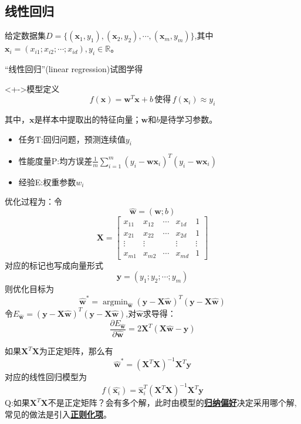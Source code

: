 \documentclass{beamer}
\begin{document}
    \subsection{线性回归}
    \begin{frame}
        给定数据集$D=\{(\bm x_1,y_1),(\bm x_2,y_2),\cdots,(\bm x_m,y_m)\}$,其中$\bm x_i=(x_{i1};x_{i2};\cdots;x_{id}),y_i\in\mathbb R$。

        ``线性回归''(linear regression)试图学得
        \begin{block}<+->{模型定义}
            $$f(\bm x)=\bm{w}^T\bm{x}+b\,\text{使得}\, f(\bm x_i)\approx y_i$$
        \end{block}
        其中，$\bm x$是样本中提取出的特征向量；$\bm w$和$b$是待学习参数。
        \begin{itemize}
            \item 任务T:回归问题，预测连续值$y_i$
            \item 性能度量P:均方误差$\frac{1}{m}\sum_{i=1}^m(y_i-\bm w\bm x_i)^T(y_i-\bm w\bm x_i)$
            \item 经验E:权重参数$w_i$
        \end{itemize}
    \end{frame}
    \begin{frame}
    优化过程为：令$$\hat{\bm w}=(\bm w;b)$$$$\bm X=\left[\begin{matrix}x_{11}&x_{12}&\cdots&x_{1d}&1\\x_{21}&x_{22}&\cdots&x_{2d}&1\\\vdots&\vdots&&\vdots&\vdots\\x_{m1}&x_{m2}&\cdots&x_{md}&1\end{matrix}\right]$$
    对应的标记也写成向量形式$$\bm y=(y_1;y_2;\cdots;y_m)$$
    则优化目标为
    $$\hat{\bm w}^\ast=\mathop{\arg\min}_{\hat{\bm w}}(\bm y-\bm X\hat{\bm w})^T(\bm y-\bm X\hat{\bm w})$$
    令$E_{\hat{\bm w}}=(\bm y-\bm X\hat{\bm w})^T(\bm y-\bm X\hat{\bm w})$,对$\hat{\bm w}$求导得：
    $$\frac{\partial E_{\hat{\bm w}}}{\partial\hat{\bm w}}=2\bm X^T(\bm X\hat{\bm w}-\bm y)$$
    \end{frame}
    \begin{frame}
        如果$\bm X^T\bm X$为正定矩阵，那么有
        $$\hat{\bm w}^\ast=(\bm X^T\bm X)^{-1}\bm X^T\bm y$$
        对应的线性回归模型为
        $$f(\hat{\bm x_i})=\hat{\bm x}_i^T(\bm X^T\bm X)^{-1}\bm X^T\bm y$$
        Q:如果$\bm X^T\bm X$不是正定矩阵？会有多个解，此时由模型的\href{http://blog.csdn.net/u011938325/article/details/75173140}{\textbf{归纳偏好}}决定采用哪个解,常见的做法是引入\href{https://www.zhihu.com/question/20924039}{\textbf{正则化项}}。
    \end{frame}
\end{document}
